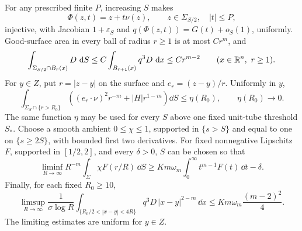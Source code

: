 \begin{lemma}\label{lem:finite-measures}
For any prescribed finite \(P\), increasing \(S\) makes
\[
 \Phi(z,t)=z+t\nu(z),\qquad z\in\Sigma_{S/2},\quad |t|\le P,
\]
injective, with Jacobian \(1+\varepsilon_S\) and
\(q(\Phi(z,t))=G(t)+o_S(1)\), uniformly.
Good-surface area in every ball of radius \(r\ge1\) is at most \(Cr^m\),
and
\begin{equation}\label{eq:B1}
 \int_{\Sigma_{S/2}\cap B_r(x)}D\,\,\mathrm d S
 \le C\int_{B_{r+1}(x)}q^3D\,\,\mathrm d x
 \le Cr^{m-2}\qquad(x\in\mathbb R^n,\ r\ge1).
\end{equation}
For \(y\in Z\), put \(r=|z-y|\) on the surface and
\(e_r=(z-y)/r\).  Uniformly in \(y\),
\begin{equation}\label{eq:B2}
 \int_{\Sigma_S\cap\{r>R_0\}}
 \left((e_r\cdot\nu)^2r^{-m}+|H|r^{1-m}\right)\dd S
 \le \eta(R_0),\qquad \eta(R_0)\longrightarrow0.
\end{equation}
The same function \(\eta\) may be used for every \(S\) above one
fixed unit-tube threshold \(S_*\).
Choose a smooth ambient \(0\le\chi\le1\), supported in \(\{s>S\}\)
and equal to one on \(\{s\ge2S\}\), with bounded first two derivatives.
For fixed nonnegative Lipschitz \(F\), supported in \([1/2,2]\), and
every \(\delta>0\), \(S\) can be chosen so that
\begin{equation}\label{eq:B3}
 \liminf_{R\to\infty}R^{-m}
 \int_{\Sigma}\chi F(r/R)\,\dd S
 \ge K m\omega_m\int_0^\infty t^{m-1}F(t)\,\dd t-\delta.
\end{equation}
Finally, for each fixed \(R_0\ge10\),
\begin{equation}\label{eq:B4}
 \limsup_{R\to\infty}\frac{1}{\sigma\log R}
 \int_{\{R_0/2<|x-y|<4R\}}q^3D\,|x-y|^{2-m}\,\dd x
 \le K m\omega_m\frac{(m-2)^2}{4}.
\end{equation}
The limiting estimates are uniform for \(y\in Z\).
\end{lemma}

